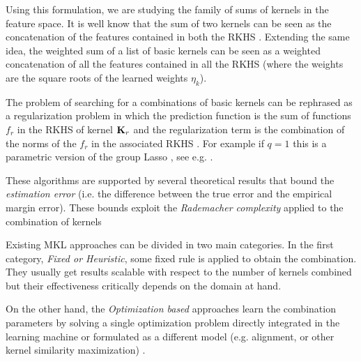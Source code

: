\documentclass{esannV2}
\newcommand{\KK}{{\bf K}}
\newcommand{\1}{{\bf 1}}
\begin{document}
Using this formulation, we are studying the family of sums of kernels in the feature space. It is well know that the sum of two kernels can be seen as the concatenation of the features contained in both the RKHS \cite{Shawe-Taylor2004}. Extending the same idea, the weighted sum of a list of basic kernels can be seen as a weighted concatenation of all the features contained in all the RKHS (where the weights are the square roots of the learned weights $\eta_k$).

The problem of searching for a combinations of basic kernels can be rephrased as a regularization problem in which the prediction function is the sum of functions $f_r$ in the RKHS of kernel $\KK_r$ and the regularization term is the combination of the norms of the $f_r$ in the associated RKHS \cite{Micchelli2005a}. %
For example if $q=1$ this is a parametric version of the group Lasso \cite{Meier2009}, see e.g. \cite{Maurer2012}.

These algorithms are supported by several theoretical results that bound the \emph{estimation error} (i.e. the difference between the true error and the empirical margin error). These bounds exploit the \emph{Rademacher complexity} applied to the combination of kernels \cite{Maurer2012,Srebro2006,Cortes2009c}%

Existing MKL approaches can be divided in two main categories. In the first category, \emph{Fixed or Heuristic}, some fixed rule is applied to obtain the combination. They usually get results scalable with respect to the number of kernels combined but their effectiveness critically depends on the domain at hand. %

On the other hand, the \emph{Optimization based} approaches learn the combination parameters by solving a single optimization problem directly integrated in the learning machine %
or formulated as a different model (e.g. alignment, or other kernel similarity maximization) \cite{Rakotomamonjy2008,Bach2004,Varma2009}. %

\end{document}
